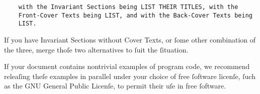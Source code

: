  \begin{verbatim}
    with the Invariant Sections being LIST THEIR TITLES, with the
    Front-Cover Texts being LIST, and with the Back-Cover Texts being
    LIST.
 \end{verbatim}

If you have Invariant Sections without Cover Texts, or ſome other 
combination of the three, merge thoſe two alternatives to ſuit the 
ſituation.

If your document contains nontrivial examples of program code, we 
recommend releaſing theſe examples in parallel under your choice of free 
ſoftware licenſe, ſuch as the GNU General Public Licenſe, to permit 
their uſe in free ſoftware.
